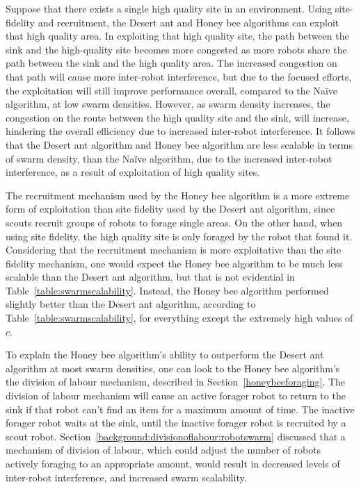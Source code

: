Suppose that there exists a single high quality site in an environment. Using site-fidelity and recruitment, the Desert ant and Honey bee algorithms can exploit that high quality area. In exploiting that high quality site, the path between the sink and the high-quality site becomes more congested as more robots share the path between the sink and the high quality area. The increased congestion on that path will cause more inter-robot interference, but due to the focused efforts, the exploitation will still improve performance overall, compared to the Na\"ive algorithm, at low swarm densities. However, as swarm density increases, the congestion on the route between the high quality site and the sink, will increase, hindering the overall efficiency due to increased inter-robot interference. It follows that the Desert ant algorithm and Honey bee algorithm are less scalable in terms of swarm density, than the Na\"ive algorithm, due to the increased inter-robot interference, as a result of exploitation of high quality sites.

The recruitment mechanism used by the Honey bee algorithm is a more extreme form of exploitation than site fidelity used by the Desert ant algorithm, since scouts recruit groups of robots to forage single areas. On the other hand, when using site fidelity, the high quality site is only foraged by the robot that found it. Considering that the recruitment mechanism is more exploitative than the site fidelity mechanism, one would expect the Honey bee algorithm to be much less scalable than the Desert ant algorithm, but that is not evidential in Table~\ref{table:swarmscalability}. Instead, the Honey bee algorithm performed slightly better than the Desert ant algorithm, according to Table~\ref{table:swarmscalability}, for everything except the extremely high values of $c$. 

To explain the Honey bee algorithm's ability to outperform the Desert ant algorithm at most swarm densities, one can look to the Honey bee algorithm's the division of labour mechanism, described in Section~\ref{honeybeeforaging}. The division of labour mechanism will cause an active forager robot to return to the sink if that robot can't find an item for a maximum amount of time. The inactive forager robot waits at the sink, until the inactive forager robot is recruited by a scout robot. Section~\ref{background:divisionoflabour:robotswarm} discussed that a mechanism of division of labour, which could adjust the number of robots actively foraging to an appropriate amount, would result in decreased levels of inter-robot interference, and increased swarm scalability.

